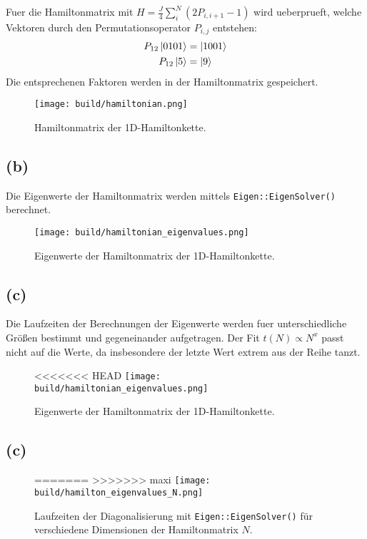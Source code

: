 \documentclass{scrartcl}
\begin{document}
Fuer die Hamiltonmatrix mit $H = \frac{J}{4} \sum_{i}^{N} \left(2 P_{i,i+1} - 1\right)$ wird ueberprueft,
welche Vektoren durch den Permutationsoperator $P_{i,j}$ entstehen:
\begin{align}
  P_{12}\ket{0 1 0 1} &= \ket{1 0 0 1} \\
        P_{12}\ket{5} &= \ket{9} \\
\end{align}
Die entsprechenen Faktoren werden in der Hamiltonmatrix gespeichert.
\begin{figure}[ht]
  \centering
  \texttt{[image: build/hamiltonian.png]}
  \caption{Hamiltonmatrix der 1D-Hamiltonkette.}%
  \label{fig:hamiltonkette}
\end{figure}

\subsection*{(b)}
Die Eigenwerte der Hamiltonmatrix werden mittels \texttt{Eigen::EigenSolver()} berechnet.
\begin{figure}[ht]
  \centering
  \texttt{[image: build/hamiltonian\_eigenvalues.png]}
  \caption{Eigenwerte der Hamiltonmatrix der 1D-Hamiltonkette.}%
  \label{fig:hamiltonkette_eigenvalues}
\end{figure}

\subsection*{(c)}
Die Laufzeiten der Berechnungen der Eigenwerte werden fuer unterschiedliche Größen bestimmt und gegeneinander aufgetragen.
Der Fit $t\left(N\right) \propto N^x$ passt nicht auf die Werte, da insbesondere der letzte Wert extrem aus der Reihe tanzt.
\begin{figure}[ht]
  \centering
<<<<<<< HEAD
  \texttt{[image: build/hamiltonian\_eigenvalues.png]}
  \caption{Eigenwerte der Hamiltonmatrix der 1D-Hamiltonkette.}%
  \label{fig:hamiltonkette_eigenvalues}
\end{figure}

\subsection*{(c)}
\begin{figure}[ht]
  \centering
=======
>>>>>>> maxi
  \texttt{[image: build/hamilton\_eigenvalues\_N.png]}
  \caption{%
    Laufzeiten der Diagonalisierung mit \texttt{Eigen::EigenSolver()} für verschiedene Dimensionen der Hamiltonmatrix $N$.
  }%
  \label{fig:build/hamilton_eigenvalues_N}
\end{figure}
\end{document}
